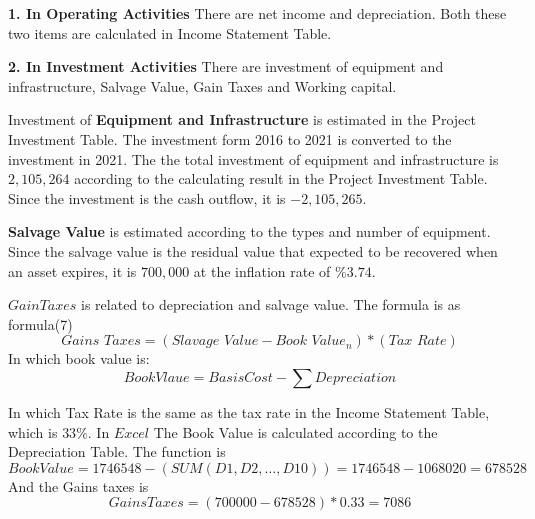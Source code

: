 \documentclass[12pt]{article}
\begin{document}
\par {\bfseries 1. In Operating Activities} There are net income and depreciation. Both these two items are calculated in Income Statement Table.
\par {\bfseries 2. In Investment Activities}  There are investment of equipment and infrastructure, Salvage Value, Gain Taxes and Working capital.
\par Investment of {\bfseries Equipment and Infrastructure} is estimated in the Project Investment Table. The investment form 2016 to 2021 is converted to the investment in 2021. The the total investment of equipment and infrastructure is $2,105,264$ according to the calculating result in the Project Investment Table. Since the investment is the cash outflow, it is $-2,105,265$.
\par {\bfseries Salvage Value} is estimated according to the types and number of equipment. Since the salvage value is the residual value that expected to be recovered when an asset expires, it is $700,000$ at the inflation rate of $\%3.74$.
\par $Gain Taxes$ is related to depreciation and salvage value. The formula is as formula(7)
\begin{equation}\label{}
  Gains\,\,Taxes=\left( Slavage\,\,Value-Book\,\,Value_n \right) *\left( Tax\,\,Rate \right)
\end{equation}
In which book value is:
\begin{equation}\label{}
  BookVlaue=BasisCost-\sum{Depreciation}
\end{equation}

In which Tax Rate is the same as the tax rate in the Income Statement Table, which is $33\%$. In $Excel$ The Book Value is calculated according to the Depreciation Table. The function is
\begin{equation}\label{}
  BookValue=1746548-(SUM(D1,D2,\ldots,D10))=1746548-1068020=678528
\end{equation}
And the Gains taxes is
\begin{equation}\label{}
  GainsTaxes=(700000-678528)*0.33=7086
\end{equation}
\end{document}
